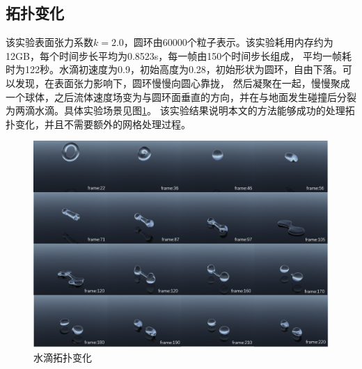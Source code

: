 \subsection{拓扑变化}
该实验表面张力系数$k = 2.0$，圆环由60000个粒子表示。该实验耗用内存约为12GB，每个时间步长平均为0.8523s，每一帧由150个时间步长组成，
平均一帧耗时为122秒。水滴初速度为0.9，初始高度为0.28，初始形状为圆环，自由下落。可以发现，在表面张力影响下，圆环慢慢向圆心靠拢，
然后凝聚在一起，慢慢聚成一个球体，之后流体速度场变为与圆环面垂直的方向，并在与地面发生碰撞后分裂为两滴水滴。具体实验场景见图\ref{fig: torus split experience}。
该实验结果说明本文的方法能够成功的处理拓扑变化，并且不需要额外的网格处理过程。
\begin{figure}[htbp]
    \centering
    \includegraphics[scale=0.56]{./images/TorusSplit.png}
    \caption[水滴拓扑变化实验]{水滴拓扑变化}
    \label{fig: torus split experience}
\end{figure}
